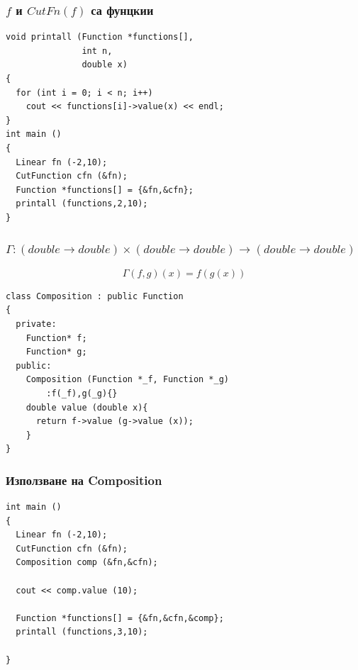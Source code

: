 \documentclass{beamer}
\begin{document}
\begin{frame}[fragile]
\frametitle{$f$ и $CutFn(f)$ са фунцкии}


\begin{flushleft}
\begin{lstlisting}
void printall (Function *functions[],
               int n,
               double x)
{
  for (int i = 0; i < n; i++)
    cout << functions[i]->value(x) << endl;
}
int main ()
{
  Linear fn (-2,10);
  CutFunction cfn (&fn);
  Function *functions[] = {&fn,&cfn};
  printall (functions,2,10);
}
\end{lstlisting}

\end{flushleft}
\end{frame}







\begin{frame}[fragile]
\frametitle{$\Gamma:(double \rightarrow double) \times (double \rightarrow double) \rightarrow(double \rightarrow double)$}

\begin{center}
$$
\Gamma(f,g)(x) = f(g(x))
$$

\begin{lstlisting}
class Composition : public Function
{
  private:
    Function* f;
    Function* g;
  public:
    Composition (Function *_f, Function *_g)
        :f(_f),g(_g){}
    double value (double x){
      return f->value (g->value (x));
    }
}
\end{lstlisting}

\end{center}


\end{frame}


\begin{frame}[fragile]
\frametitle{Използване на Composition}


\begin{flushleft}

\begin{lstlisting}
int main ()
{
  Linear fn (-2,10);
  CutFunction cfn (&fn);
  Composition comp (&fn,&cfn);

  cout << comp.value (10);

  Function *functions[] = {&fn,&cfn,&comp};
  printall (functions,3,10);

}
\end{lstlisting}

\end{flushleft}


\end{frame}
\end{document}
